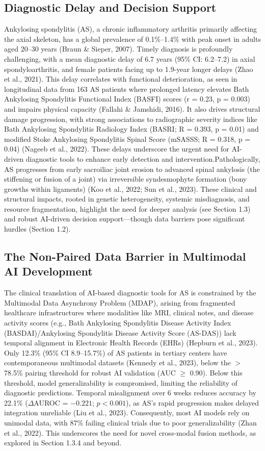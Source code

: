 \documentclass[12pt, a4paper]{article}
\begin{document}
\subsection{Diagnostic Delay and Decision Support}
Ankylosing spondylitis (AS), a chronic inflammatory arthritis primarily affecting the axial skeleton, has a global prevalence of 0.1\%–1.4\% with peak onset in adults aged 20–30 years (Braun \& Sieper, 2007). Timely diagnosis is profoundly challenging, with a mean diagnostic delay of 6.7 years (95\% CI: 6.2–7.2) in axial spondyloarthritis, and female patients facing up to 1.9-year longer delays (Zhao et al., 2021). This delay correlates with functional deterioration, as seen in longitudinal data from 163 AS patients where prolonged latency elevates Bath Ankylosing Spondylitis Functional Index (BASFI) scores (r = 0.23, p = 0.003) and impairs physical capacity (Fallahi \& Jamshidi, 2016). It also drives structural damage progression, with strong associations to radiographic severity indices like Bath Ankylosing Spondylitis Radiology Index (BASRI; R = 0.393, p = 0.01) and modified Stoke Ankylosing Spondylitis Spinal Score (mSASSS; R = 0.318, p = 0.04) (Nageeb et al., 2022). These delays underscore the urgent need for AI-driven diagnostic tools to enhance early detection and intervention.Pathologically, AS progresses from early sacroiliac joint erosion to advanced spinal ankylosis (the stiffening or fusion of a joint) via irreversible syndesmophyte formation (bony growths within ligaments) (Koo et al., 2022; Sun et al., 2023). These clinical and structural impacts, rooted in genetic heterogeneity, systemic misdiagnosis, and resource fragmentation, highlight the need for deeper analysis (see Section 1.3) and robust AI-driven decision support---though data barriers pose significant hurdles (Section 1.2).

\subsection{The Non-Paired Data Barrier in Multimodal AI Development}
The clinical translation of AI-based diagnostic tools for AS is constrained by the Multimodal Data Asynchrony Problem (MDAP), arising from fragmented healthcare infrastructures where modalities like MRI, clinical notes, and disease activity scores (e.g., Bath Ankylosing Spondylitis Disease Activity Index (BASDAI)/Ankylosing Spondylitis Disease Activity Score (AS-DAS)) lack temporal alignment in Electronic Health Records (EHRs) (Hepburn et al., 2023). Only 12.3\% (95\% CI 8.9--15.7\%) of AS patients in tertiary centers have contemporaneous multimodal datasets (Kennedy et al., 2023), below the $>$ 78.5\% pairing threshold for robust AI validation (AUC $\geq$ 0.90). Below this threshold, model generalizability is compromised, limiting the reliability of diagnostic predictions. Temporal misalignment over 6 weeks reduces accuracy by 22.1\% ($\Delta$AUROC = $-0.221$; $p < 0.001$), as AS's rapid progression makes delayed integration unreliable (Liu et al., 2023). Consequently, most AI models rely on unimodal data, with 87\% failing clinical trials due to poor generalizability (Zhan et al., 2022). This underscores the need for novel cross-modal fusion methods, as explored in Section 1.3.4 and beyond.
\end{document}
